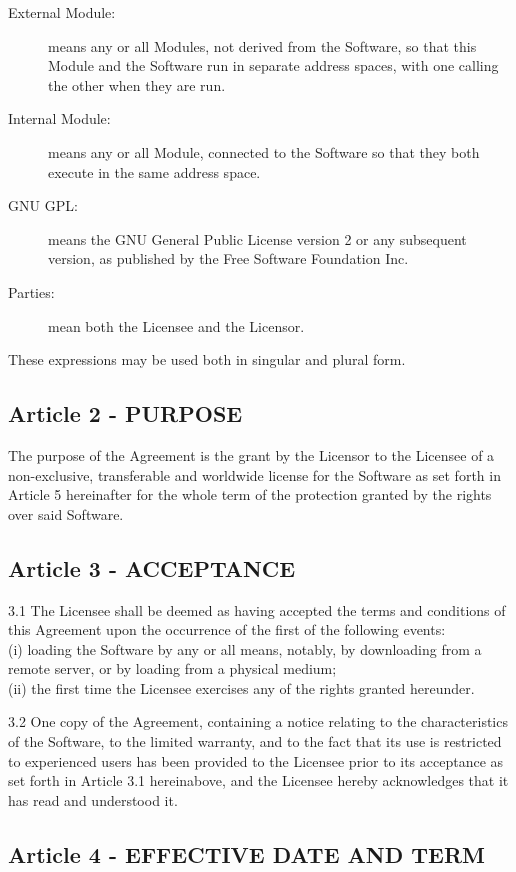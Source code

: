 \begin{description}
\item[External Module:] means any or all Modules, not derived from the Software, so that this Module and the Software run in separate address spaces, with one calling the other when they are run.
\item[Internal Module:] means any or all Module, connected to the Software so that they both execute in the same address space.
\item[GNU GPL:] means the GNU General Public License version 2 or any subsequent version, as published by the Free Software Foundation Inc.
\item[Parties:] mean both the Licensee and the Licensor.
\end{description}

These expressions may be used both in singular and plural form.

\subsection*{Article 2 - PURPOSE}

The purpose of the Agreement is the grant by the Licensor to the Licensee of a non-exclusive, transferable and worldwide license for the Software as set forth in Article 5 hereinafter for the whole term of the protection granted by the rights over said Software.

\subsection*{Article 3 - ACCEPTANCE}

3.1 The Licensee shall be deemed as having accepted the terms and conditions of this Agreement upon the occurrence of the first of the following events:\\
(i) loading the Software by any or all means, notably, by downloading from a remote server, or by loading from a physical medium;\\
(ii) the first time the Licensee exercises any of the rights granted hereunder.

3.2 One copy of the Agreement, containing a notice relating to the characteristics of the Software, to the limited warranty, and to the fact that its use is restricted to experienced users has been provided to the Licensee prior to its acceptance as set forth in Article 3.1 hereinabove, and the Licensee hereby acknowledges that it has read and understood it.

\subsection*{Article 4 - EFFECTIVE DATE AND TERM}

